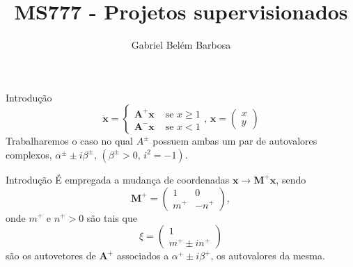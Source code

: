 \documentclass[aspectratio=169]{beamer}
\title{MS777 - Projetos supervisionados}
\author{{Gabriel Belém Barbosa}
}
\begin{document}
\begin{frame}{}
\maketitle
\end{frame}

\begin{frame}{Introdução}
\begin{equation}
\label{eqn:og}
\dot{\mathbf{x}}=\left\{\begin{array}{ll}
\mathbf{A}^{+} \mathbf{x} & \text { se } x \geq 1 \\
\mathbf{A}^{-} \mathbf{x} & \text { se } x<1
\end{array}
\text{, }\mathbf{x}=
\begin{pmatrix}
x\\
y
\end{pmatrix}
\right.
\end{equation}\pause    
Trabalharemos o caso no qual $A^\pm$  possuem ambas um par de autovalores complexos, $\alpha^{\pm} \pm i \beta^{\pm}\text{, }(\beta^{\pm}>0\text{, } i^{2}=-1)$.
\end{frame}

\begin{frame}{Introdução}
É empregada a mudança de coordenadas $\mathbf{x} \rightarrow \mathbf{M^+ x}$, sendo
\[
\mathbf{M^+}=\left(\begin{array}{cc}
1 & 0 \\
m^+ & -n^+
\end{array}\right),
\] \pause 
onde $m^+$ e $n^+>0$ são tais que 
\[
\xi=\begin{pmatrix}
1\\
m^+ \pm in^+
\end{pmatrix}
\] 
são os autovetores de $\mathbf{A}^{+}$ associados a $\alpha^{+} \pm i \beta^{+}$, os autovalores da mesma.
\end{frame}
\end{document}
